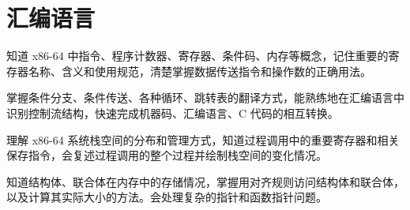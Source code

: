 \chapter{汇编语言}
    \begin{summary}
        \begin{compactitem}
            \item 知道 x86-64 中指令、程序计数器、寄存器、条件码、内存等概念，记住重要的寄存器名称、含义和使用规范，清楚掌握数据传送指令和操作数的正确用法。
            \item 掌握条件分支、条件传送、各种循环、跳转表的翻译方式，能熟练地在汇编语言中识别控制流结构，快速完成机器码、汇编语言、C 代码的相互转换。
            \item 理解 x86-64 系统栈空间的分布和管理方式，知道过程调用中的重要寄存器和相关保存指令，会复述过程调用的整个过程并绘制栈空间的变化情况。
            \item 知道结构体、联合体在内存中的存储情况，掌握用对齐规则访问结构体和联合体，以及计算其实际大小的方法。会处理复杂的指针和函数指针问题。
        \end{compactitem}
    \end{summary}


